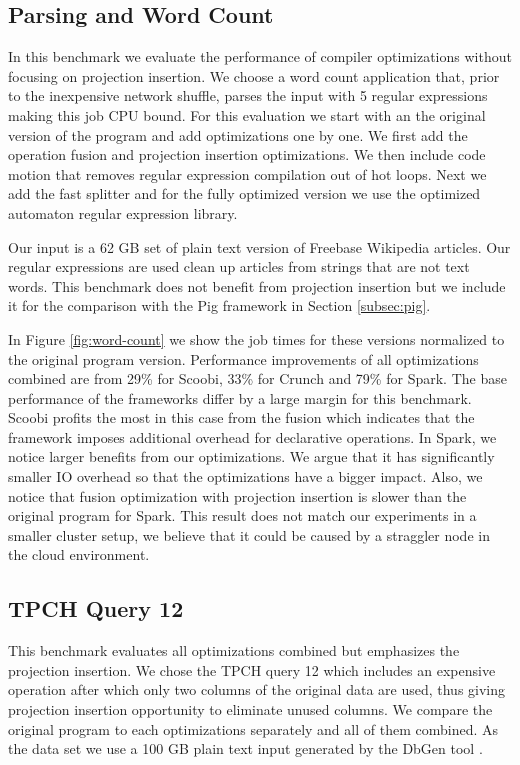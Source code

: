 \subsection{Parsing and Word Count}
\label{subsec:parsing-word-count}

In this benchmark we evaluate the performance of \tool compiler optimizations without focusing on projection insertion. We choose a word count application that, prior to the inexpensive network shuffle, parses the input with 5 regular expressions making this job CPU bound. For this evaluation we start with an the original version of the program and add optimizations one by one. We first add the operation fusion and projection insertion optimizations. We then include code motion that removes regular expression compilation out of hot loops. Next we add the fast splitter and for the fully optimized version we use the optimized automaton regular expression library.    

Our input is a 62 GB set of plain text version of Freebase Wikipedia articles. Our regular expressions are used clean up articles from strings that are not text words. This benchmark does not benefit from projection insertion but we include it for the comparison with the Pig framework in Section \ref{subsec:pig}.

In Figure \ref{fig:word-count} we show the job times for these versions normalized to the original program version. Performance improvements of all optimizations combined are from 29\% for Scoobi, 33\% for Crunch and 79\% for Spark. The base performance of the frameworks differ by a large margin for this benchmark. Scoobi profits the most in this case from the fusion which indicates that the framework imposes additional overhead for declarative operations. In Spark, we notice larger benefits from our optimizations. We argue that it has significantly smaller IO overhead so that the optimizations have a bigger impact. Also, we notice that fusion optimization with projection insertion is slower than the original program for Spark. This result does not match our experiments in a smaller cluster setup, we believe that it could be caused by a straggler node in the cloud environment.

\subsection{TPCH Query 12}
\label{subsec:tpch-query-12}

This benchmark evaluates all optimizations combined but emphasizes the projection insertion. We chose the TPCH query 12 which includes an expensive  operation after which only two columns of the original data are used, thus giving projection insertion opportunity to eliminate unused columns. We compare the original program to each optimizations separately and all of them combined. As the data set we use a 100 GB plain text input generated by the DbGen tool \cite{tpch}.

